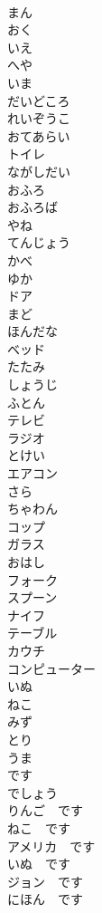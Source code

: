 \documentclass[8pt]{extreport}
\begin{document}
\begin{CJK}{UTF8}{min}
\\	まん	
\\	おく	
\\	いえ 
\\	へや	
\\	いま 
\\	だいどころ	
\\	れいぞうこ	
\\	おてあらい	
\\	トイレ	
\\	ながしだい	
\\	おふろ	
\\	おふろば	
\\	やね	
\\	てんじょう	
\\	かべ	
\\	ゆか	
\\	ドア	
\\	まど	
\\	ほんだな	
\\	ベッド	
\\	たたみ	
\\	しょうじ	
\\	ふとん	
\\	テレビ	
\\	ラジオ	
\\	とけい	
\\	エアコン	
\\	さら	
\\	ちゃわん	
\\	コップ	
\\	ガラス	
\\	おはし	
\\	フォーク	
\\	スプーン	
\\	ナイフ	
\\	テーブル	
\\	カウチ	
\\	コンピューター	
\\	いぬ	
\\	ねこ	
\\	みず	
\\	とり	
\\	うま	
\\	です	
\\	でしょう	
\\	りんご　です	
\\	ねこ　です	
\\	アメリカ　です	
\\	いぬ　です	
\\	ジョン　です	
\\	にほん　です	

\end{CJK}
\end{document}
